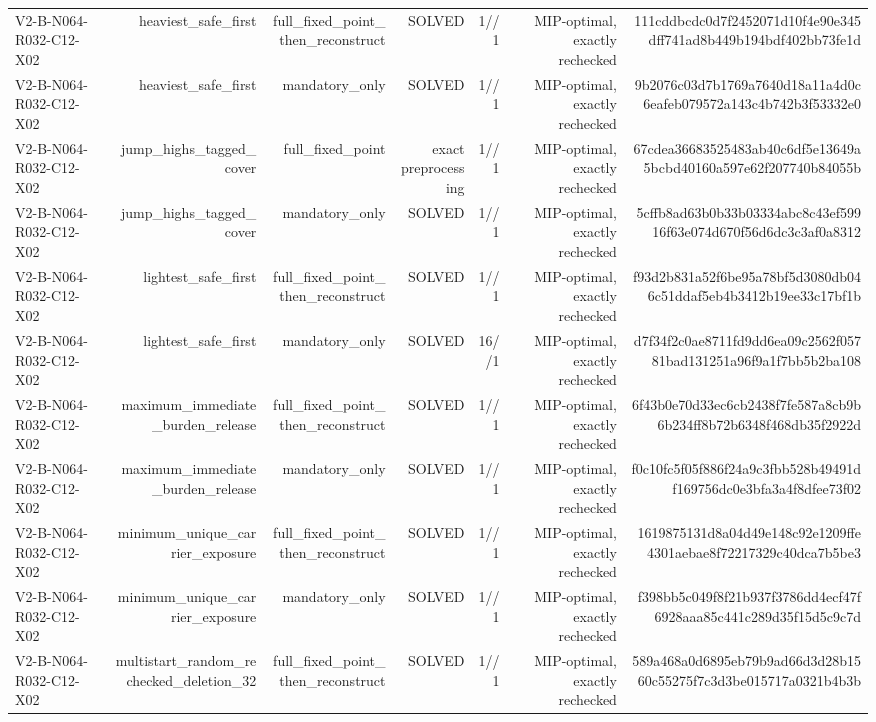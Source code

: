 {\begin{longtable}{lrrrrrr}
V2-B-N064-R032-C12-X02 & heaviest\_safe\_first & full\_fixed\_point\_then\_reconstruct & SOLVED & 1//1 & MIP-optimal, exactly rechecked & 111cddbcdc0d7f2452071d10f4e90e345dff741ad8b449b194bdf402bb73fe1d \\
V2-B-N064-R032-C12-X02 & heaviest\_safe\_first & mandatory\_only & SOLVED & 1//1 & MIP-optimal, exactly rechecked & 9b2076c03d7b1769a7640d18a11a4d0c6eafeb079572a143c4b742b3f53332e0 \\
V2-B-N064-R032-C12-X02 & jump\_highs\_tagged\_cover & full\_fixed\_point & exact preprocessing & 1//1 & MIP-optimal, exactly rechecked & 67cdea36683525483ab40c6df5e13649a5bcbd40160a597e62f207740b84055b \\
V2-B-N064-R032-C12-X02 & jump\_highs\_tagged\_cover & mandatory\_only & SOLVED & 1//1 & MIP-optimal, exactly rechecked & 5cffb8ad63b0b33b03334abc8c43ef59916f63e074d670f56d6dc3c3af0a8312 \\
V2-B-N064-R032-C12-X02 & lightest\_safe\_first & full\_fixed\_point\_then\_reconstruct & SOLVED & 1//1 & MIP-optimal, exactly rechecked & f93d2b831a52f6be95a78bf5d3080db046c51ddaf5eb4b3412b19ee33c17bf1b \\
V2-B-N064-R032-C12-X02 & lightest\_safe\_first & mandatory\_only & SOLVED & 16//1 & MIP-optimal, exactly rechecked & d7f34f2c0ae8711fd9dd6ea09c2562f05781bad131251a96f9a1f7bb5b2ba108 \\
V2-B-N064-R032-C12-X02 & maximum\_immediate\_burden\_release & full\_fixed\_point\_then\_reconstruct & SOLVED & 1//1 & MIP-optimal, exactly rechecked & 6f43b0e70d33ec6cb2438f7fe587a8cb9b6b234ff8b72b6348f468db35f2922d \\
V2-B-N064-R032-C12-X02 & maximum\_immediate\_burden\_release & mandatory\_only & SOLVED & 1//1 & MIP-optimal, exactly rechecked & f0c10fc5f05f886f24a9c3fbb528b49491df169756dc0e3bfa3a4f8dfee73f02 \\
V2-B-N064-R032-C12-X02 & minimum\_unique\_carrier\_exposure & full\_fixed\_point\_then\_reconstruct & SOLVED & 1//1 & MIP-optimal, exactly rechecked & 1619875131d8a04d49e148c92e1209ffe4301aebae8f72217329c40dca7b5be3 \\
V2-B-N064-R032-C12-X02 & minimum\_unique\_carrier\_exposure & mandatory\_only & SOLVED & 1//1 & MIP-optimal, exactly rechecked & f398bb5c049f8f21b937f3786dd4ecf47f6928aaa85c441c289d35f15d5c9c7d \\
V2-B-N064-R032-C12-X02 & multistart\_random\_rechecked\_deletion\_32 & full\_fixed\_point\_then\_reconstruct & SOLVED & 1//1 & MIP-optimal, exactly rechecked & 589a468a0d6895eb79b9ad66d3d28b1560c55275f7c3d3be015717a0321b4b3b \\

\end{longtable}}
